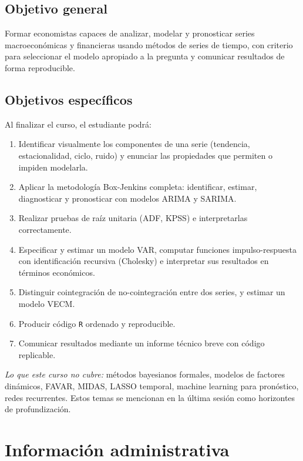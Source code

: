 \documentclass[11pt,letterpaper]{article}
\begin{document}
\subsection{Objetivo general}

Formar economistas capaces de analizar, modelar y pronosticar series macroeconómicas y financieras 
usando métodos de series de tiempo, con criterio para seleccionar el modelo apropiado a la pregunta 
y comunicar resultados de forma reproducible.

\subsection{Objetivos específicos}

Al finalizar el curso, el estudiante podrá:

\begin{enumerate}[leftmargin=*, itemsep=0.2em]
  \item Identificar visualmente los componentes de una serie (tendencia, estacionalidad, ciclo, ruido) y enunciar las propiedades que permiten o impiden modelarla.
  \item Aplicar la metodología Box-Jenkins completa: identificar, estimar, diagnosticar y pronosticar con modelos ARIMA y SARIMA.
  \item Realizar pruebas de raíz unitaria (ADF, KPSS) e interpretarlas correctamente.
  \item Especificar y estimar un modelo VAR, computar funciones impulso-respuesta con identificación recursiva (Cholesky) e interpretar sus resultados en términos económicos.
  \item Distinguir cointegración de no-cointegración entre dos series, y estimar un modelo VECM.
  \item Producir código \texttt{R} ordenado y reproducible.
  \item Comunicar resultados mediante un informe técnico breve con código replicable.
\end{enumerate}

\textit{Lo que este curso no cubre:} métodos bayesianos formales, modelos de factores dinámicos, FAVAR, MIDAS, LASSO temporal, machine learning para pronóstico, redes recurrentes. Estos temas se mencionan en la última sesión como horizontes de profundización.

\section{Información administrativa}
\end{document}
